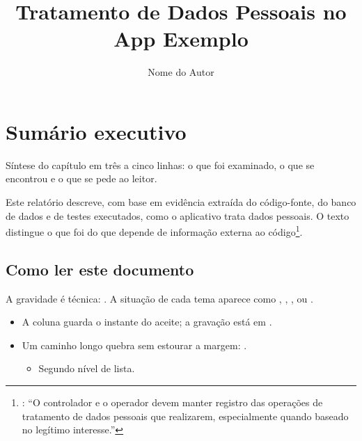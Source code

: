 \documentclass[11pt,a4paper,oneside]{report}
\title{Tratamento de Dados Pessoais no App Exemplo}
\author{Nome do Autor}
\begin{document}
\FazerCapa
\tableofcontents

\chapter{Sumário executivo}\label{cap:sumario}
\begin{destaquebox}
Síntese do capítulo em três a cinco linhas: o que foi examinado, o que se encontrou e o que se pede ao leitor.
\end{destaquebox}

Este relatório descreve, com base em evidência extraída do código-fonte, do banco de dados e de testes executados, como o aplicativo trata dados pessoais. O texto distingue o que foi  do que depende de informação externa ao código\footnote{: \enquote{O controlador e o operador devem manter registro das operações de tratamento de dados pessoais que realizarem, especialmente quando baseado no legítimo interesse.}}.

\noindent
\begin{minipage}{0.235\textwidth}\end{minipage}\hfill
\begin{minipage}{0.235\textwidth}\end{minipage}\hfill
\begin{minipage}{0.235\textwidth}\end{minipage}\hfill
\begin{minipage}{0.235\textwidth}\end{minipage}

\section{Como ler este documento}
A gravidade é técnica:     . A situação de cada tema aparece como , , ,  ou .

\begin{itemize}
  \item A coluna  guarda o instante do aceite; a gravação está em .
  \item Um caminho longo quebra sem estourar a margem: .
  \begin{itemize}
    \item Segundo nível de lista.
  \end{itemize}
\end{itemize}
\end{document}

